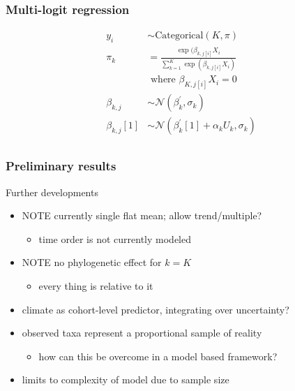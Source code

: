\documentclass{beamer}
\begin{document}
\begin{frame}
  \frametitle{Multi-logit regression}
  \begin{equation*}
    \begin{aligned}
      y_{i} &\sim \mathrm{Categorical}(K, \pi) \\  %
      \pi_{k} &= \frac{\exp(\beta_{k, j[i]} X_{i}}{\sum_{k = 1}^{K} \exp(\beta_{k, j[i]} X_{i})} \\ 
      &\text{ where } \beta_{K, j[i]} X_{i} = 0 \\
      \beta_{k, j} &\sim \mathcal{N}(\beta_{k}^{\prime}, \sigma_{k}) \\
      \beta_{k, j}[1] &\sim \mathcal{N}(\beta_{k}^{\prime}[1] + \alpha_{k} U_{k}, \sigma_{k}) \\
    \end{aligned}
  \end{equation*}
\end{frame}

\begin{frame}
  \frametitle{Preliminary results}
\end{frame}

\begin{frame}
  \begin{block}{Further developments}
    \begin{itemize}
      \item \uppercase{\alert{note}} currently single flat mean; allow trend/multiple?
        \begin{itemize}
          \item time order is not currently modeled
        \end{itemize}
      \item \uppercase{\alert{note}} no phylogenetic effect for \(k = K\)
        \begin{itemize}
          \item every thing is relative \alert{to} it
        \end{itemize}
      \item climate as cohort-level predictor, integrating over uncertainty?
      \item observed taxa represent a proportional sample of reality
        \begin{itemize}
          \item how can this be overcome in a \alert{model based} framework?
        \end{itemize}
      \item limits to complexity of model due to sample size
    \end{itemize}
  \end{block}
\end{frame}
\end{document}

